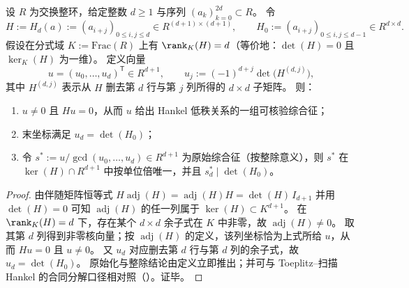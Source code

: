 \begin{theorem}[余子式综合征与单坐标判别]\label{thm:xi-hankel-cofactor-syndrome-single-coordinate}
设 \(R\) 为交换整环，给定整数 \(d\ge 1\) 与序列 \((a_k)_{k=0}^{2d}\subset R\)。
令
\[
H:=H_d(a):=(a_{i+j})_{0\le i,j\le d}\in R^{(d+1)\times(d+1)},
\qquad
H_0:=(a_{i+j})_{0\le i,j\le d-1}\in R^{d\times d}.
\]
假设在分式域 \(K:=\mathrm{Frac}(R)\) 上有 \(\rank_K(H)=d\)（等价地：\(\det(H)=0\) 且 \(\ker_K(H)\) 为一维）。
定义向量
\[
u=(u_0,\dots,u_d)^{\mathsf T}\in R^{d+1},
\qquad
u_j:=(-1)^{d+j}\det\bigl(H^{(d,j)}\bigr),
\]
其中 \(H^{(d,j)}\) 表示从 \(H\) 删去第 \(d\) 行与第 \(j\) 列所得的 \(d\times d\) 子矩阵。
则：
\begin{enumerate}
  \item \(u\neq 0\) 且 \(Hu=0\)，从而 \(u\) 给出 Hankel 低秩关系的一组可核验综合征；
  \item 末坐标满足 \(u_d=\det(H_0)\)；
  \item 令 \(s^\ast:=u/\gcd(u_0,\dots,u_d)\in R^{d+1}\) 为原始综合征（按整除意义），则 \(s^\ast\) 在 \(\ker(H)\cap R^{d+1}\) 中按单位倍唯一，并且 \(s^\ast_d\mid \det(H_0)\)。
\end{enumerate}
\end{theorem}
\begin{proof}
由伴随矩阵恒等式
\(
H\operatorname{adj}(H)=\operatorname{adj}(H)H=\det(H)\,I_{d+1}
 \)
并用 \(\det(H)=0\) 可知 \(\operatorname{adj}(H)\) 的任一列属于 \(\ker(H)\subset K^{d+1}\)。
在 \(\rank_K(H)=d\) 下，存在某个 \(d\times d\) 余子式在 \(K\) 中非零，故 \(\operatorname{adj}(H)\neq 0\)。
取其第 \(d\) 列得到非零核向量；按 \(\operatorname{adj}(H)\) 的定义，该列坐标恰为上式所给 \(u\)，从而 \(Hu=0\) 且 \(u\neq 0\)。
又 \(u_d\) 对应删去第 \(d\) 行与第 \(d\) 列的余子式，故 \(u_d=\det(H_0)\)。
原始化与整除结论由定义立即推出；并可与 Toeplitz--扫描 Hankel 的合同分解口径相对照（\cite{Internal2026ToeplitzScanHankelBlaschkeVanVleck}）。证毕。
\end{proof}

